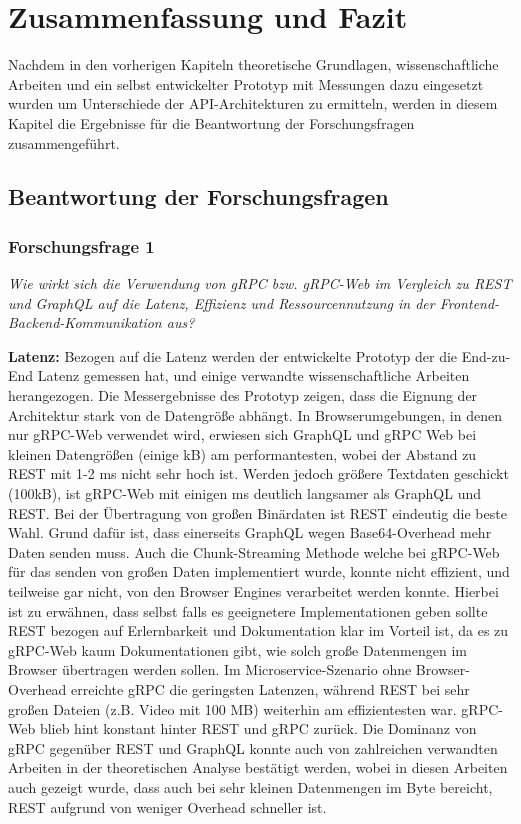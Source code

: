 \chapter{Zusammenfassung und Fazit}
\label{chap:intro}
Nachdem in den vorherigen Kapiteln theoretische Grundlagen, wissenschaftliche Arbeiten und ein selbst entwickelter Prototyp mit Messungen dazu eingesetzt wurden  um Unterschiede der API-Architekturen zu ermitteln, werden in diesem Kapitel die Ergebnisse für die Beantwortung der Forschungsfragen zusammengeführt.
\chapterstart
\section{Beantwortung der Forschungsfragen}
\subsection*{Forschungsfrage 1}
\textit{Wie wirkt sich die Verwendung von gRPC bzw. gRPC-Web im Vergleich zu REST und GraphQL auf die Latenz, Effizienz und Ressourcennutzung in der Frontend-Backend-Kommunikation aus?}

\textbf{Latenz:} 
Bezogen auf die Latenz werden der entwickelte Prototyp der die End-zu-End Latenz gemessen hat, und einige verwandte wissenschaftliche Arbeiten herangezogen.
Die Messergebnisse des Prototyp zeigen, dass die Eignung der Architektur stark von de Datengröße abhängt. 
In Browserumgebungen, in denen nur gRPC-Web verwendet wird, erwiesen sich GraphQL und gRPC Web bei kleinen Datengrößen (einige kB) am performantesten, wobei der Abstand zu REST mit 1-2 ms nicht sehr hoch ist. 
Werden jedoch größere Textdaten geschickt (100kB), ist gRPC-Web mit einigen ms deutlich langsamer als GraphQL und REST. Bei der Übertragung von großen Binärdaten ist REST eindeutig die beste Wahl. Grund dafür ist, dass einerseits GraphQL wegen Base64-Overhead mehr Daten senden muss. Auch die Chunk-Streaming Methode welche bei gRPC-Web für das senden von großen Daten implementiert wurde, konnte nicht effizient, und teilweise gar nicht, von den Browser Engines verarbeitet werden konnte. Hierbei ist zu erwähnen, dass selbst falls es geeignetere Implementationen geben sollte REST bezogen auf Erlernbarkeit und Dokumentation klar im Vorteil ist, da es zu gRPC-Web kaum Dokumentationen gibt, wie solch große Datenmengen im Browser übertragen werden sollen.
Im Microservice-Szenario ohne Browser-Overhead erreichte gRPC die geringsten Latenzen, während REST bei sehr großen Dateien (z.B. Video mit 100 MB) weiterhin am effizientesten war. gRPC-Web blieb hint konstant hinter REST und gRPC zurück.
Die Dominanz von gRPC gegenüber REST und GraphQL konnte auch von zahlreichen verwandten Arbeiten in der theoretischen Analyse bestätigt werden, wobei in diesen Arbeiten auch gezeigt wurde, dass auch bei sehr kleinen Datenmengen im Byte bereicht, REST aufgrund von weniger Overhead schneller ist.

